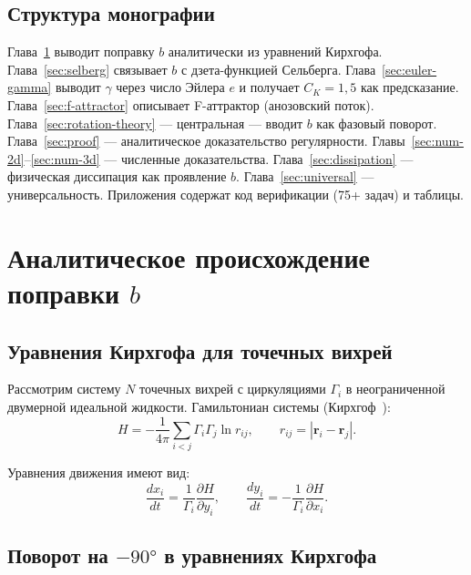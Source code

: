 \documentclass[11pt,a4paper,twoside]{article}
\theoremstyle{remark}
\begin{document}
\subsection{Структура монографии}

Глава~\ref{sec:origin} выводит поправку $b$ аналитически из уравнений Кирхгофа. Глава~\ref{sec:selberg} связывает $b$ с дзета-функцией Сельберга. Глава~\ref{sec:euler-gamma} выводит $\gamma$ через число Эйлера $e$ и получает $C_K = 1{,}5$ как предсказание. Глава~\ref{sec:f-attractor} описывает F-аттрактор (анозовский поток). Глава~\ref{sec:rotation-theory} --- центральная --- вводит $b$ как фазовый поворот. Глава~\ref{sec:proof} --- аналитическое доказательство регулярности. Главы~\ref{sec:num-2d}--\ref{sec:num-3d} --- численные доказательства. Глава~\ref{sec:dissipation} --- физическая диссипация как проявление $b$. Глава~\ref{sec:universal} --- универсальность. Приложения содержат код верификации (75+ задач) и таблицы.

\section{Аналитическое происхождение поправки \texorpdfstring{$b$}{b}}
\label{sec:origin}

\subsection{Уравнения Кирхгофа для точечных вихрей}

Рассмотрим систему $N$ точечных вихрей с циркуляциями $\Gamma_i$ в неограниченной двумерной идеальной жидкости. Гамильтониан системы (Кирхгоф~\cite{kirchhoff1876}):
\begin{equation}
H = -\frac{1}{4\pi}\sum_{i<j}\Gamma_i\Gamma_j\ln r_{ij}, \qquad r_{ij} = |\mathbf{r}_i - \mathbf{r}_j|.
\label{eq:hamiltonian}
\end{equation}

Уравнения движения имеют вид:
\begin{equation}
\frac{dx_i}{dt} = \frac{1}{\Gamma_i}\frac{\partial H}{\partial y_i}, \qquad \frac{dy_i}{dt} = -\frac{1}{\Gamma_i}\frac{\partial H}{\partial x_i}.
\label{eq:kirchhoff}
\end{equation}

\subsection{Поворот на \texorpdfstring{$-90°$}{-90°} в уравнениях Кирхгофа}
\end{document}
